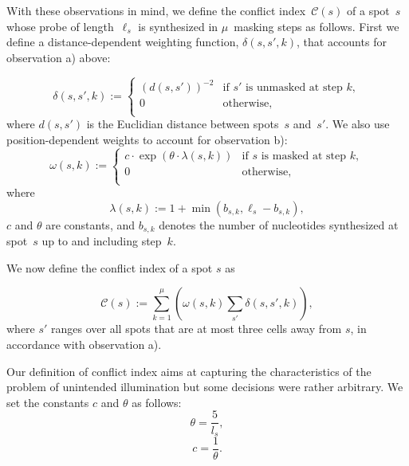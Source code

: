 \documentclass{bioinfo}
\begin{document}
With these observations in mind, we define the conflict index~$\mathcal{C}(s)$ of a spot~$s$ whose probe of length~$\ell_{s}$ is synthesized in $\mu$~masking steps as follows. First we define a distance-dependent weighting function, $\delta(s,s',k)$, that accounts for observation a) above:

\begin{equation}
\label{eq:dist_weight}
\delta(s,s',k) :=
        \left\{
                \begin{array}{ll}
                        (d(s,s'))^{-2} & \mbox{if $s'$ is unmasked at step $k$}, \\
                        0 & \mbox{otherwise}, \\
                \end{array}
        \right.
\end{equation}
where $d(s,s')$ is the Euclidian distance between spots~$s$ and~$s'$. We also use position-dependent weights to account for observation b):
\begin{equation}
\label{eq:pos_mult}
\omega(s,k) :=
        \left\{
                \begin{array}{ll}
                        c \cdot \exp{\left(\theta \cdot \lambda(s,k)\right)} & \mbox{if $s$ is masked at step $k$}, \\
                        0 & \mbox{otherwise}, \\
                \end{array}
        \right.
\end{equation}
where
\begin{equation}
\label{eq:base_pos}
\lambda(s,k) := 1 + \min(b_{s,k},\ell_{s} - b_{s,k}),
\end{equation}
$c$ and $\theta$ are constants, and $b_{s,k}$ denotes the number of nucleotides synthesized at spot~$s$ up to and including step~$k$.

We now define the conflict index of a spot $s$ as

\begin{equation}
\label{eq:conf_idx}
\mathcal{C}(s) := \sum_{k=1}^{\mu} \left( \omega(s,k) \sum_{s'} \delta(s,s',k) \right),
\end{equation}
where $s'$ ranges over all spots that are at most three cells away from $s$, in accordance with observation a).

Our definition of conflict index aims at capturing the characteristics of the problem of unintended illumination but some decisions were rather arbitrary. We set the constants $c$ and $\theta$ as follows:
\begin{displaymath}
\theta = \frac{5}{l_s},
\end{displaymath}
\begin{displaymath}
c = \frac{1}{\theta}.
\end{displaymath}
\end{document}
